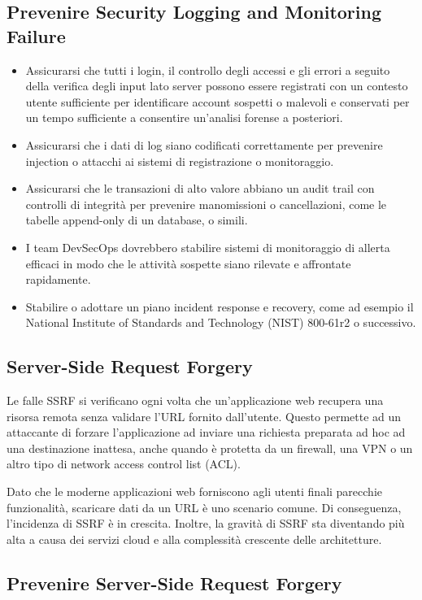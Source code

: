 \subsection{Prevenire Security Logging and Monitoring Failure}
\begin{itemize}
    \item Assicurarsi che tutti i login, il controllo degli accessi e gli errori a seguito della verifica degli input lato server possono essere registrati con un contesto utente sufficiente per identificare account sospetti o malevoli e conservati per un tempo sufficiente a consentire un'analisi forense a posteriori.
    \item Assicurarsi che i dati di log siano codificati correttamente per prevenire injection o attacchi ai sistemi di registrazione o monitoraggio.
    \item Assicurarsi che le transazioni di alto valore abbiano un audit trail con controlli di integrità per prevenire manomissioni o cancellazioni, come le tabelle append-only di un database, o simili.
    \item I team DevSecOps dovrebbero stabilire sistemi di monitoraggio di allerta efficaci in modo che le attività sospette siano rilevate e affrontate rapidamente.
    \item Stabilire o adottare un piano incident response e recovery, come ad esempio il National Institute of Standards and Technology (NIST) 800-61r2 o successivo.
\end{itemize}
\subsection{Server-Side Request Forgery}
Le falle SSRF si verificano ogni volta che un'applicazione web recupera una risorsa remota senza validare l'URL fornito dall'utente. Questo permette ad un attaccante di forzare l'applicazione ad inviare una richiesta preparata ad hoc ad una destinazione inattesa, anche quando è protetta da un firewall, una VPN o un altro tipo di network access control list (ACL).

Dato che le moderne applicazioni web forniscono agli utenti finali parecchie funzionalità, scaricare dati da un URL è uno scenario comune. Di conseguenza, l'incidenza di SSRF è in crescita. Inoltre, la gravità di SSRF sta diventando più alta a causa dei servizi cloud e alla complessità crescente delle architetture.
\subsection{Prevenire Server-Side Request Forgery}
